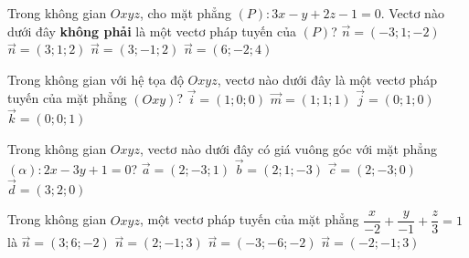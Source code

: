 \begin{ex}%
	Trong không gian $O x y z$, cho mặt phẳng $(P)\colon 3 x-y+2 z-1=0$. Vectơ nào dưới đây \textbf{không phải} là một vectơ pháp tuyến của $(P)$?
	\choice
	{$\overrightarrow{n}=(-3; 1;-2)$}
	{\True $\overrightarrow{n}=(3; 1; 2)$}
	{$\overrightarrow{n}=(3;-1; 2)$}
	{$\overrightarrow{n}=(6;-2; 4)$}
\end{ex}

\begin{ex}%
	Trong không gian với hệ tọa độ $O x y z$, vectơ nào dưới đây là một vectơ pháp tuyến của mặt phẳng $(O x y)$?
	\choice
	{$\overrightarrow{i}=(1; 0; 0)$}
	{$\overrightarrow{m}=(1; 1; 1)$}
	{$\overrightarrow{j}=(0; 1; 0)$}
	{\True $\overrightarrow{k}=(0; 0; 1)$}
\end{ex}

\begin{ex}%
	Trong không gian $O x y z$, vectơ nào dưới đây có giá vuông góc với mặt phẳng $(\alpha)\colon 2 x-3 y+1=0$?
	\choice
	{$\overrightarrow{a}=(2;-3; 1)$}
	{$\overrightarrow{b}=(2; 1;-3)$}
	{\True $\overrightarrow{c}=(2;-3; 0)$}
	{$\overrightarrow{d}=(3; 2; 0)$}
\end{ex}

\begin{ex}%
	Trong không gian $O x y z$, một vectơ pháp tuyến của mặt phẳng $\dfrac{x}{-2}+\dfrac{y}{-1}+\dfrac{z}{3}=1$ là
	\choice
	{\True $\overrightarrow{n}=(3; 6;-2)$}
	{$\overrightarrow{n}=(2;-1; 3)$}
	{$\overrightarrow{n}=(-3;-6;-2)$}
	{$\overrightarrow{n}=(-2;-1; 3)$}
\end{ex}

